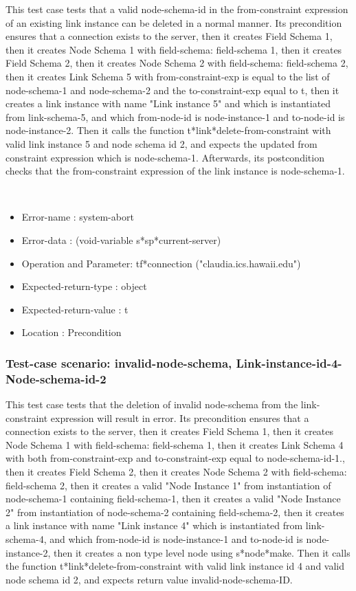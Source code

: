 This test case tests that a valid node-schema-id in the from-constraint expression of an existing link instance can be deleted in a normal manner.
Its precondition ensures that a connection exists to the server, then it creates Field Schema 1, then it creates Node Schema 1 with field-schema: field-schema 1, then it creates Field Schema 2, then it creates Node Schema 2 with field-schema: field-schema 2, then it creates Link Schema 5 with from-constraint-exp is equal to the list of node-schema-1 and node-schema-2 and the to-constraint-exp equal to t, then it creates a link instance with name "Link instance 5" and which is instantiated from link-schema-5, and which  from-node-id is node-instance-1 and to-node-id is node-instance-2.
Then it calls the function t*link*delete-from-constraint  with valid link instance 5 and node schema id 2, and expects the updated from constraint expression which is node-schema-1.
Afterwards, its postcondition checks that the from-constraint expression of the link instance is node-schema-1.


\
\begin {itemize}
\item 	Error-name             : system-abort
\item Error-data             : (void-variable s*sp*current-server)
\item Operation and Parameter: tf*connection ("claudia.ics.hawaii.edu")
\item Expected-return-type   : object
\item Expected-return-value  : t
\item Location               : Precondition



\end {itemize}
\subsubsection {Test-case scenario: invalid-node-schema, Link-instance-id-4-Node-schema-id-2}


This test case tests that the deletion of invalid node-schema from the link-constraint expression  will result in error.
Its precondition ensures that a connection exists to the server, then it creates Field Schema 1, then it creates Node Schema 1 with field-schema: field-schema 1, then it creates Link Schema 4 with both  from-constraint-exp and to-constraint-exp equal to node-schema-id-1., then it creates Field Schema 2, then it creates Node Schema 2 with field-schema: field-schema 2, then it creates a valid "Node Instance 1" from instantiation of node-schema-1 containing field-schema-1, then it creates a valid "Node Instance 2" from instantiation of node-schema-2 containing field-schema-2, then it creates a link instance with name "Link instance 4" which is instantiated from link-schema-4, and which  from-node-id is node-instance-1 and to-node-id is node-instance-2, then it creates a non type level node using s*node*make.
Then it calls the function t*link*delete-from-constraint  with valid link instance id 4 and valid node schema id 2, and expects return value invalid-node-schema-ID.



